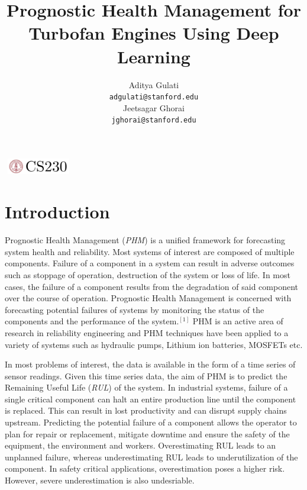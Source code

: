 \documentclass[a4paper,12pt]{article}
\title{Prognostic Health Management for Turbofan Engines Using Deep Learning}
\author{
Aditya Gulati\\
\texttt{adgulati@stanford.edu} \\
\And
Jeetsagar Ghorai \\
\texttt{jghorai@stanford.edu} \\
}
\begin{document}
\begin{center}
\includegraphics[width=3cm, height=0.7cm]{CS230}
\end{center}
\maketitle


\section{Introduction}

Prognostic Health Management (\emph{PHM}) is a unified framework for forecasting
system health and reliability. Most systems of interest are composed of multiple
components. Failure of a component in a system can result in adverse outcomes
such as stoppage of operation, destruction of the system or loss of life. In
most cases, the failure of a component results from the degradation of said
component over the course of operation. Prognostic Health Management is
concerned with forecasting potential failures of systems by monitoring the
status of the components and the performance of the system.\(^{[1]}\) PHM is an
active area of research in reliability engineering and PHM techniques have been
applied to a variety of systems such as hydraulic pumps, Lithium ion batteries,
MOSFETs etc.

In most problems of interest, the data is available in the form of a time series
of sensor readings. Given this time series data, the aim of PHM is to predict
the Remaining Useful Life (\emph{RUL}) of the system. In industrial systems,
failure of a single critical component can halt an entire production line until
the component is replaced. This can result in lost productivity and can disrupt
supply chains upstream. Predicting the potential failure of a component allows
the operator to plan for repair or replacement, mitigate downtime and ensure the
safety of the equipment, the environment and workers. Overestimating RUL leads
to an unplanned failure, whereas underestimating RUL leads to underutilization
of the component. In safety critical applications, overestimation poses a higher
risk. However, severe underestimation is also undesriable.

\end{document}
